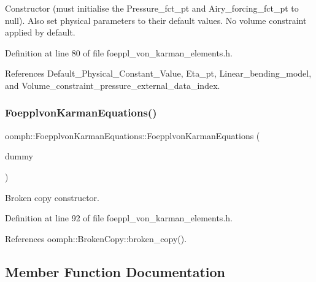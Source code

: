 Constructor (must initialise the Pressure\+\_\+fct\+\_\+pt and Airy\+\_\+forcing\+\_\+fct\+\_\+pt to null). Also set physical parameters to their default values. No volume constraint applied by default. 



Definition at line 80 of file foeppl\+\_\+von\+\_\+karman\+\_\+elements.\+h.



References Default\+\_\+\+Physical\+\_\+\+Constant\+\_\+\+Value, Eta\+\_\+pt, Linear\+\_\+bending\+\_\+model, and Volume\+\_\+constraint\+\_\+pressure\+\_\+external\+\_\+data\+\_\+index.

\mbox{\label{classoomph_1_1FoepplvonKarmanEquations_a75ad16a38b782683818999500446dd55}} 
\subsubsection{\texorpdfstring{Foepplvon\+Karman\+Equations()}{FoepplvonKarmanEquations()}\hspace{0.1cm}{\footnotesize\ttfamily [2/2]}}
{\footnotesize\ttfamily oomph\+::\+Foepplvon\+Karman\+Equations\+::\+Foepplvon\+Karman\+Equations (\begin{DoxyParamCaption}\item[{const \hyperlink{classoomph_1_1FoepplvonKarmanEquations}{Foepplvon\+Karman\+Equations} \&}]{dummy }\end{DoxyParamCaption})\hspace{0.3cm}{\ttfamily [inline]}}



Broken copy constructor. 



Definition at line 92 of file foeppl\+\_\+von\+\_\+karman\+\_\+elements.\+h.



References oomph\+::\+Broken\+Copy\+::broken\+\_\+copy().



\subsection{Member Function Documentation}
\mbox{\label{classoomph_1_1FoepplvonKarmanEquations_a9eac8c0d991ce23a846c89c07f82b649}} 
